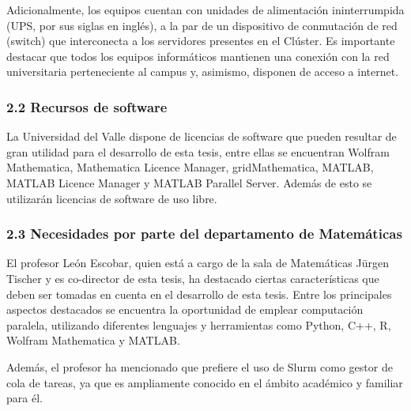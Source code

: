 \begin{spacing}{1.5}
  Adicionalmente, los equipos cuentan con unidades de alimentación ininterrumpida (UPS, por sus siglas en inglés), a la par de un dispositivo de conmutación de red (switch) que interconecta a los servidores presentes en el Clúster. Es importante destacar que todos los equipos informáticos mantienen una conexión con la red universitaria perteneciente al campus y, asimismo, disponen de acceso a internet.

  \subsubsection{2.2 Recursos de software}

  La Universidad del Valle dispone de licencias de software que pueden resultar de gran utilidad para el desarrollo de esta tesis, entre ellas se encuentran Wolfram Mathematica, Mathematica Licence Manager, gridMathematica, MATLAB, MATLAB Licence Manager y MATLAB Parallel Server. Además de esto se utilizarán licencias de software de uso libre.

  \subsubsection{2.3 Necesidades por parte del departamento de Matemáticas}

  El profesor León Escobar, quien está a cargo de la sala de Matemáticas Jürgen Tischer y es co-director de esta tesis, ha destacado ciertas características que deben ser tomadas en cuenta en el desarrollo de esta tesis. Entre los principales aspectos destacados se encuentra la oportunidad de emplear computación paralela, utilizando diferentes lenguajes y herramientas como Python, C++, R, Wolfram Mathematica y MATLAB. 

  Además, el profesor ha mencionado que prefiere el uso de Slurm como gestor de cola de tareas, ya que es ampliamente conocido en el ámbito académico y familiar para él.

  \mylinespacing
  \mylinespacing
  \begin{tightcenter}
  \end{tightcenter}
\end{spacing}
